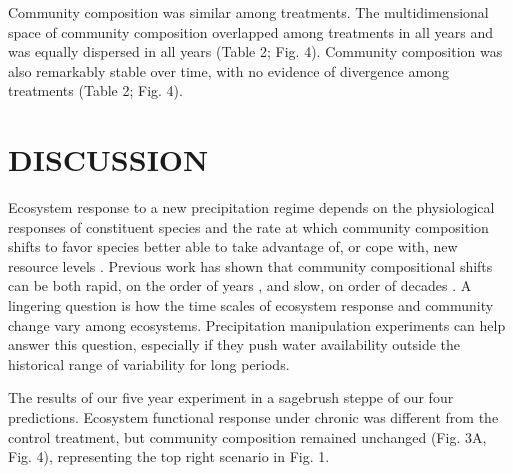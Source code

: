 \documentclass[fleqn,10pt,lineno]{wlpeerj} %
\begin{document}
Community composition was similar among treatments. The multidimensional
space of community composition overlapped among treatments in all years
and was equally dispersed in all years (Table 2; Fig. 4). Community
composition was also remarkably stable over time, with no evidence of
divergence among treatments (Table 2; Fig. 4).

\section{DISCUSSION}\label{discussion}

Ecosystem response to a new precipitation regime depends on the
physiological responses of constituent species and the rate at which
community composition shifts to favor species better able to take
advantage of, or cope with, new resource levels \citep{Smith2009}.
Previous work has shown that community compositional shifts can be both
rapid, on the order of years \citep{Hoover2014}, and slow, on order of
decades \citep{Knapp2012, Wilcox2016}. A lingering question is how the
time scales of ecosystem response and community change vary among
ecosystems. Precipitation manipulation experiments can help answer this
question, especially if they push water availability outside the
historical range of variability for long periods.

The results of our five year experiment in a sagebrush steppe
 of our four predictions. Ecosystem functional
response under chronic  was different from the control
treatment, but community composition remained unchanged (Fig. 3A, Fig.
4), representing the top right scenario in Fig. 1.
\end{document}
